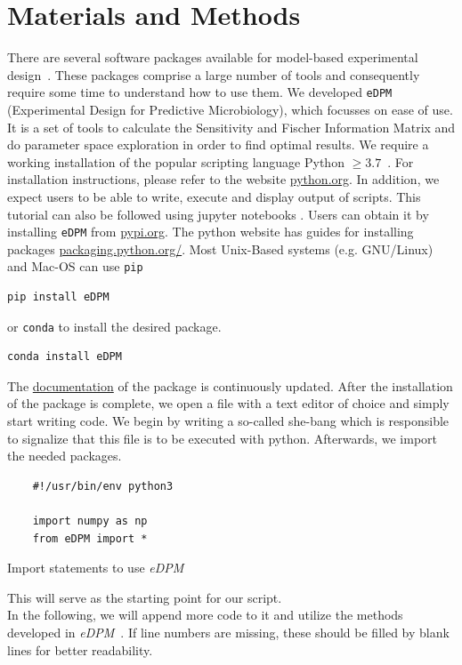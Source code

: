 \documentclass[10pt,A4paper]{article}
\begin{document}
\section*{Materials and Methods}
There are several software packages available for model-based experimental design~\cite{balsa-canto_amigo2_2016, zhang_optimal_2018, busetto_near-optimal_2013}.
These packages comprise a large number of tools and consequently require some time to understand how to use them.
We developed \texttt{eDPM} (Experimental Design for Predictive Microbiology), which focusses on ease of use.
It is a set of tools to calculate the Sensitivity and Fischer Information Matrix and do parameter space exploration in order to find optimal results.
We require a working installation of the popular scripting language Python $\geq3.7$~\cite{rossumPythonLanguageReference2010}.
For installation instructions, please refer to the website \href{https://www.python.org/downloads/}{python.org}.
In addition, we expect users to be able to write, execute and display output of scripts.
This tutorial can also be followed using jupyter notebooks \cite{jupyterteamJupyterNotebook}.
Users can obtain it by installing \texttt{eDPM} from \href{https://pypi.org/project/edpm/0.0.1/}{pypi.org}.
The python website has guides for installing packages \href{https://packaging.python.org/en/latest/tutorials/installing-packages/}{packaging.python.org/}.
Most Unix-Based systems (e.g. GNU/Linux) and Mac-OS can use \texttt{pip}
\begin{verbatim}
pip install eDPM
\end{verbatim}
or \texttt{conda} to install the desired package.
\begin{verbatim}
conda install eDPM
\end{verbatim}
The \href{https://spatial-systems-biology-freiburg.github.io/eDPM/}{documentation} of the package is continuously updated.
After the installation of the package is complete, we open a file with a text editor of choice and simply start writing code.
We begin by writing a so-called she-bang which is responsible to signalize that this file is to be executed with python.
Afterwards, we import the needed packages.
\begin{code}[h]
    \begin{verbatim}
    #!/usr/bin/env python3

    import numpy as np
    from eDPM import *
    \end{verbatim}
    \caption{Import statements to use {\it eDPM}}
    \label{code:import_statements}
\end{code}
This will serve as the starting point for our script.\\
In the following, we will append more code to it and utilize the methods developed in {\it eDPM}~\cite{edpm2023}.
If line numbers are missing, these should be filled by blank lines for better readability.
%
%
\end{document}
